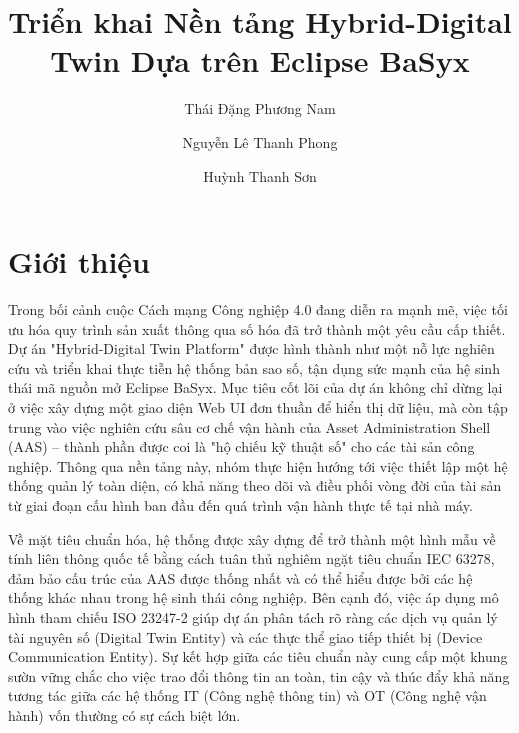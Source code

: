 \documentclass[twocolumn]{article}
\title{\textbf{Triển khai Nền tảng Hybrid-Digital Twin Dựa trên Eclipse BaSyx}}
\author[1,2]{Thái Đặng Phương Nam}
\author[2]{Nguyễn Lê Thanh Phong}
\author[2]{Huỳnh Thanh Sơn}
\affil[1]{Người báo cáo chính}
\affil[2]{Wisdom Software}
\affil[*]{TP. Hồ Chí Minh, Tháng 01 năm 2026}
\begin{document}

\section{Giới thiệu}
Trong bối cảnh cuộc Cách mạng Công nghiệp 4.0 đang diễn ra mạnh mẽ, việc tối ưu hóa quy trình sản xuất thông qua số hóa đã trở thành một yêu cầu cấp thiết. Dự án "Hybrid-Digital Twin Platform" được hình thành như một nỗ lực nghiên cứu và triển khai thực tiễn hệ thống bản sao số, tận dụng sức mạnh của hệ sinh thái mã nguồn mở Eclipse BaSyx. Mục tiêu cốt lõi của dự án không chỉ dừng lại ở việc xây dựng một giao diện Web UI đơn thuần để hiển thị dữ liệu, mà còn tập trung vào việc nghiên cứu sâu cơ chế vận hành của Asset Administration Shell (AAS) – thành phần được coi là "hộ chiếu kỹ thuật số" cho các tài sản công nghiệp. Thông qua nền tảng này, nhóm thực hiện hướng tới việc thiết lập một hệ thống quản lý toàn diện, có khả năng theo dõi và điều phối vòng đời của tài sản từ giai đoạn cấu hình ban đầu đến quá trình vận hành thực tế tại nhà máy.

Về mặt tiêu chuẩn hóa, hệ thống được xây dựng để trở thành một hình mẫu về tính liên thông quốc tế bằng cách tuân thủ nghiêm ngặt tiêu chuẩn IEC 63278, đảm bảo cấu trúc của AAS được thống nhất và có thể hiểu được bởi các hệ thống khác nhau trong hệ sinh thái công nghiệp. Bên cạnh đó, việc áp dụng mô hình tham chiếu ISO 23247-2 giúp dự án phân tách rõ ràng các dịch vụ quản lý tài nguyên số (Digital Twin Entity) và các thực thể giao tiếp thiết bị (Device Communication Entity). Sự kết hợp giữa các tiêu chuẩn này cung cấp một khung sườn vững chắc cho việc trao đổi thông tin an toàn, tin cậy và thúc đẩy khả năng tương tác giữa các hệ thống IT (Công nghệ thông tin) và OT (Công nghệ vận hành) vốn thường có sự cách biệt lớn.
\end{document}
